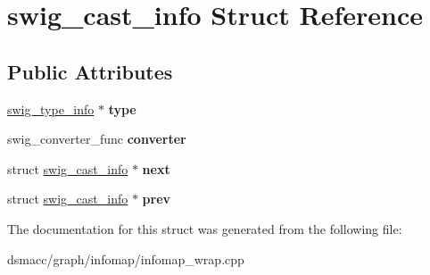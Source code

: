 \hypertarget{structswig__cast__info}{}\section{swig\+\_\+cast\+\_\+info Struct Reference}
\label{structswig__cast__info}
\subsection*{Public Attributes}
\begin{DoxyCompactItemize}
\item 
\mbox{\label{structswig__cast__info_a1c9023a301c8d6806209f4e10df6e9e0}} 
\mbox{\hyperlink{structswig__type__info}{swig\+\_\+type\+\_\+info}} $\ast$ {\bfseries type}
\item 
\mbox{\label{structswig__cast__info_aa630fddfbb1bf9c97a03f9479ba32f76}} 
swig\+\_\+converter\+\_\+func {\bfseries converter}
\item 
\mbox{\label{structswig__cast__info_ae79c6fa058a9d908bbdac14db0c9db5e}} 
struct \mbox{\hyperlink{structswig__cast__info}{swig\+\_\+cast\+\_\+info}} $\ast$ {\bfseries next}
\item 
\mbox{\label{structswig__cast__info_afc685bcf38a5a06c6601775138c5999c}} 
struct \mbox{\hyperlink{structswig__cast__info}{swig\+\_\+cast\+\_\+info}} $\ast$ {\bfseries prev}
\end{DoxyCompactItemize}


The documentation for this struct was generated from the following file\+:\begin{DoxyCompactItemize}
\item 
dsmacc/graph/infomap/infomap\+\_\+wrap.\+cpp\end{DoxyCompactItemize}
